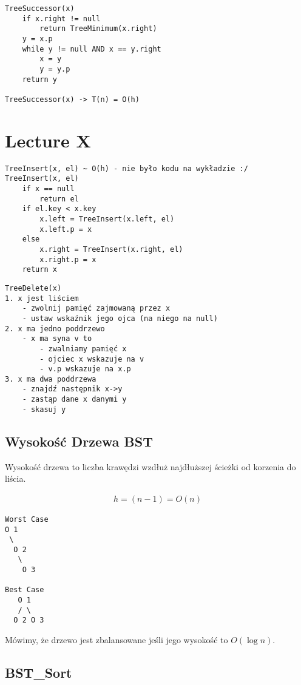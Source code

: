 \documentclass{article}
\numberwithin{equation}{subsection}
\newenvironment{definition}[1]{%
    \trivlist
    \item[\hskip\labelsep\textbf{Definition. #1.}]
    \ignorespaces
}{%
    \endtrivlist
}
\begin{document}
\begin{verbatim}
TreeSuccessor(x)
    if x.right != null
        return TreeMinimum(x.right)
    y = x.p
    while y != null AND x == y.right
        x = y
        y = y.p
    return y

TreeSuccessor(x) -> T(n) = O(h)
\end{verbatim}

\section{Lecture X}

\begin{verbatim}
TreeInsert(x, el) ~ O(h) - nie było kodu na wykładzie :/
TreeInsert(x, el)
    if x == null
        return el
    if el.key < x.key
        x.left = TreeInsert(x.left, el)
        x.left.p = x
    else
        x.right = TreeInsert(x.right, el)
        x.right.p = x
    return x
\end{verbatim}

\begin{verbatim}
TreeDelete(x)
1. x jest liściem
    - zwolnij pamięć zajmowaną przez x
    - ustaw wskaźnik jego ojca (na niego na null)
2. x ma jedno poddrzewo
    - x ma syna v to
        - zwalniamy pamięć x
        - ojciec x wskazuje na v
        - v.p wskazuje na x.p
3. x ma dwa poddrzewa
    - znajdź następnik x->y
    - zastąp dane x danymi y
    - skasuj y
\end{verbatim}

\subsection{Wysokość Drzewa BST}

Wysokość drzewa to liczba krawędzi wzdłuż najdłuższej ścieżki od korzenia do liścia.

\begin{align}
h = (n-1) = O(n)
\end{align}

\begin{verbatim}
Worst Case
O 1
 \
  O 2
   \
    O 3

Best Case
   O 1
   / \
  O 2 O 3
\end{verbatim}

\begin{definition}{Drzewo zbalansowane}
    Mówimy, że drzewo jest zbalansowane jeśli jego wysokość to $O(\log n)$.
\end{definition}

\subsection{BST\_Sort}
\end{document}
